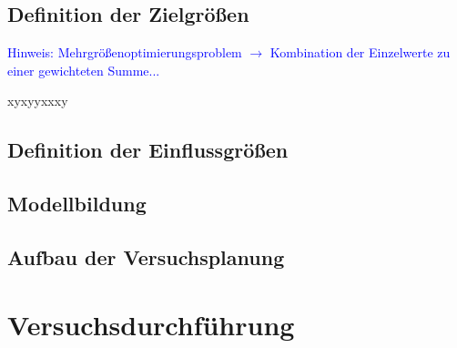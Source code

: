 \documentclass[
fontsize=10pt, 
listof = totoc,
parskip = half	
]{report}
\begin{document}
\subsection{Definition der Zielgrößen}

\textcolor{blue}{Hinweis: Mehrgrößenoptimierungsproblem $\to$ Kombination der Einzelwerte zu einer gewichteten Summe...}

xyxyyxxxy

\subsection{Definition der Einflussgrößen}

\subsection{Modellbildung}

\subsection{Aufbau der Versuchsplanung}

\section{Versuchsdurchführung}
\end{document}
